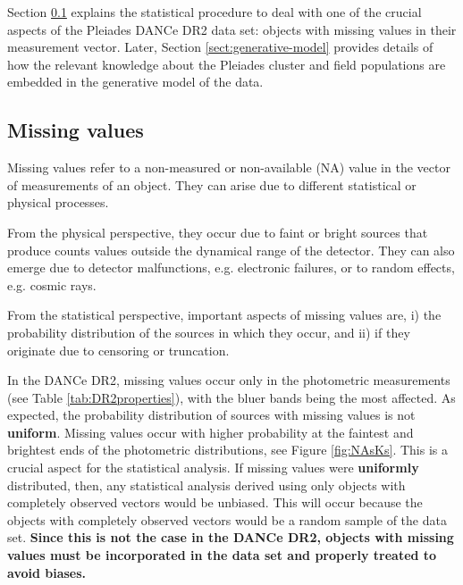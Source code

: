 Section \ref{sect:missing} explains the statistical procedure to deal with one of the crucial aspects of the Pleiades DANCe DR2 data set: objects with missing values in their measurement vector. Later, Section \ref{sect:generative-model} provides details of how the relevant knowledge about the Pleiades cluster and field populations are embedded in the generative model of the data.
\subsection{Missing values}
\label{sect:missing}

Missing values refer to a non-measured or non-available (NA) value in the vector of measurements of an object. They can arise due to different statistical or physical processes. 

From the physical perspective, they occur due to faint or bright sources that produce counts values outside the dynamical range of the detector. They can also emerge due to detector malfunctions, e.g. electronic failures, or to random effects, e.g. cosmic rays. 

From the statistical perspective, important aspects of missing values are, i) the probability distribution of the sources in which they occur, and ii) if they originate due to censoring or truncation. 

In the DANCe DR2, missing values occur only in the photometric measurements (see Table \ref{tab:DR2properties}), with the bluer bands being the most affected. As expected, the probability distribution of sources with missing values is not \textbf{uniform}. Missing values occur with higher probability at the faintest and brightest ends of the photometric distributions, see Figure \ref{fig:NAsKs}. This is a crucial aspect for the statistical analysis. If missing values were \textbf{uniformly} distributed, then, any statistical analysis derived using only objects with completely observed vectors would be unbiased. This will occur because the objects with completely observed vectors would be a random sample of the data set. \textbf{Since this is not the case in the DANCe DR2, objects with missing values must be incorporated in the data set and properly treated to avoid biases.} 

